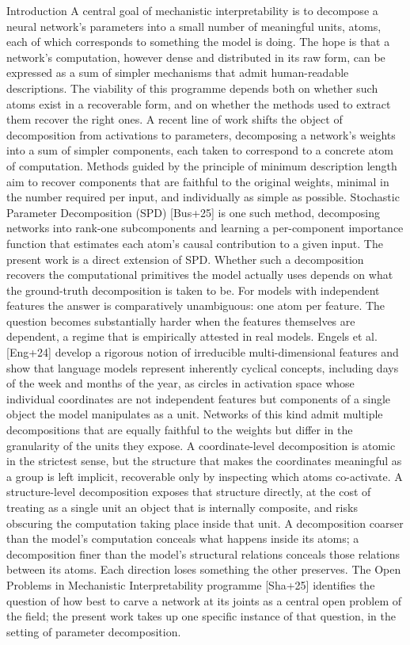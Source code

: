 Introduction
A central goal of mechanistic interpretability is to decompose a neural network's parameters into a small number of meaningful units, atoms, each of which corresponds to something the model is doing. The hope is that a network's computation, however dense and distributed in its raw form, can be expressed as a sum of simpler mechanisms that admit human-readable descriptions. The viability of this programme depends both on whether such atoms exist in a recoverable form, and on whether the methods used to extract them recover the right ones.
A recent line of work shifts the object of decomposition from activations to parameters, decomposing a network's weights into a sum of simpler components, each taken to correspond to a concrete atom of computation. Methods guided by the principle of minimum description length aim to recover components that are faithful to the original weights, minimal in the number required per input, and individually as simple as possible. Stochastic Parameter Decomposition (SPD) [Bus+25] is one such method, decomposing networks into rank-one subcomponents and learning a per-component importance function that estimates each atom's causal contribution to a given input. The present work is a direct extension of SPD.
Whether such a decomposition recovers the computational primitives the model actually uses depends on what the ground-truth decomposition is taken to be. For models with independent features the answer is comparatively unambiguous: one atom per feature. The question becomes substantially harder when the features themselves are dependent, a regime that is empirically attested in real models. Engels et al. [Eng+24] develop a rigorous notion of irreducible multi-dimensional features and show that language models represent inherently cyclical concepts, including days of the week and months of the year, as circles in activation space whose individual coordinates are not independent features but components of a single object the model manipulates as a unit.
Networks of this kind admit multiple decompositions that are equally faithful to the weights but differ in the granularity of the units they expose. A coordinate-level decomposition is atomic in the strictest sense, but the structure that makes the coordinates meaningful as a group is left implicit, recoverable only by inspecting which atoms co-activate. A structure-level decomposition exposes that structure directly, at the cost of treating as a single unit an object that is internally composite, and risks obscuring the computation taking place inside that unit. A decomposition coarser than the model's computation conceals what happens inside its atoms; a decomposition finer than the model's structural relations conceals those relations between its atoms. Each direction loses something the other preserves. The Open Problems in Mechanistic Interpretability programme [Sha+25] identifies the question of how best to carve a network at its joints as a central open problem of the field; the present work takes up one specific instance of that question, in the setting of parameter decomposition.
